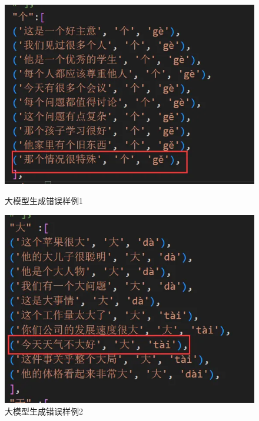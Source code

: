 \documentclass[12pt,hyperref,a4paper,UTF8]{ctexart}
\begin{document}
\begin{figure}[htbp]
    \centering
    \begin{minipage}[b]{0.45\textwidth}
        \centering
        \includegraphics[width=\textwidth]{figures/image.png} %
        \caption{大模型生成错误样例1}
        \label{fig91}
    \end{minipage}
    \hspace{0.05\textwidth} %
    \begin{minipage}[b]{0.45\textwidth}
        \centering
        \includegraphics[width=\textwidth]{figures/image1.png} %
        \caption{大模型生成错误样例2}
        \label{fig92}
    \end{minipage}
\end{figure}
\end{document}
